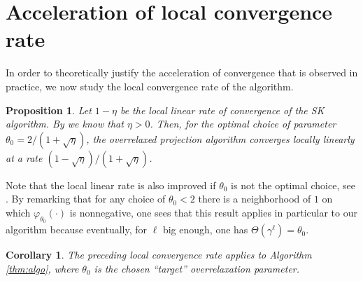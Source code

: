 \documentclass{article} %
\theoremstyle{plain}
\newtheorem{proposition}{Proposition}
\newtheorem{corollary}{Corollary}
\theoremstyle{definition}
\theoremstyle{remark}
\begin{document}
\section{Acceleration of local convergence rate}
\label{section:local}
In order to theoretically justify the acceleration of convergence that is observed in practice, we now study the local convergence rate of the algorithm. %

\begin{proposition}\label{prop:local}
Let $1-\eta$ be the local linear rate of convergence of the SK algorithm. By \cite{knight2008sinkhorn} we know that $\eta>0$. Then, for the optimal choice of parameter $\theta_0 = 2/(1+\sqrt{\eta})$, the overrelaxed projection algorithm converges locally linearly at a rate $(1-\sqrt{\eta})/(1+\sqrt{\eta})$.
\end{proposition}

Note that the local linear rate is also improved if $\theta_0$ is not the optimal choice, see \cite[chapter 5]{ciarlet1982introduction}. By remarking that for any choice of $\theta_0<2$ there is a neighborhood of $1$ on which $\varphi_{\theta_0}(\cdot)$ is nonnegative, one sees that this result applies in particular to our algorithm because eventually, for $\ell$ big enough, one has $\Theta(\gamma^\ell)=\theta_0$.
\begin{corollary}
The preceding local convergence rate applies to Algorithm \ref{thm:algo}, where $\theta_0$ is the chosen ``target'' overrelaxation parameter.
\end{corollary}
\end{document}
